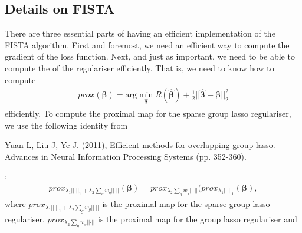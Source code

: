 \documentclass[letterpaper,10pt,english]{sphinxmanual}
\begin{document}
\subsection{Details on FISTA}
\label{\detokenize{maths:details-on-fista}}
There are three essential parts of having an efficient implementation of the
FISTA algorithm. First and foremost, we need an efficient way to compute the
gradient of the loss function. Next, and just as important, we need to be able
to compute the  of the regulariser efficiently. That is, we need
to know how to compute
\begin{equation*}
\begin{split}prox(\mathbf{\beta}) = \text{arg} \min_{\hat{\mathbf{\beta}}}
R(\hat{\mathbf{\beta}}) + \frac{1}{2}||\hat{\mathbf{\beta}} - \mathbf{\beta}||_2^2\end{split}
\end{equation*}
efficiently. To compute the proximal map for the sparse group lasso regulariser,
we use the following identity from %
\begin{footnote}[4]\sphinxAtStartFootnote
Yuan L, Liu J, Ye J. (2011), Efficient methods for overlapping group
lasso. Advances in Neural Information Processing Systems (pp. 352-360).
%
\end{footnote}:
\begin{equation*}
\begin{split}prox_{\lambda_1 ||\mathbf{\cdot}||_1 + \lambda_2 \sum_g w_g ||\mathbf{\cdot}||}(\mathbf{\beta})
= prox_{\lambda_2 \sum_g w_g ||\mathbf{\cdot}||}(prox_{\lambda_1 ||\mathbf{\cdot}||_1}(\mathbf{\beta}),\end{split}
\end{equation*}
where \(prox_{\lambda_1 ||\mathbf{\cdot}||_1 + \lambda_2 \sum_g w_g ||\mathbf{\cdot}||}\)
is the proximal map for the sparse group lasso regulariser,
\(prox_{\lambda_2 \sum_g w_g ||\mathbf{\cdot}||}\) is the proximal map
for the group lasso regulariser and
\end{document}
